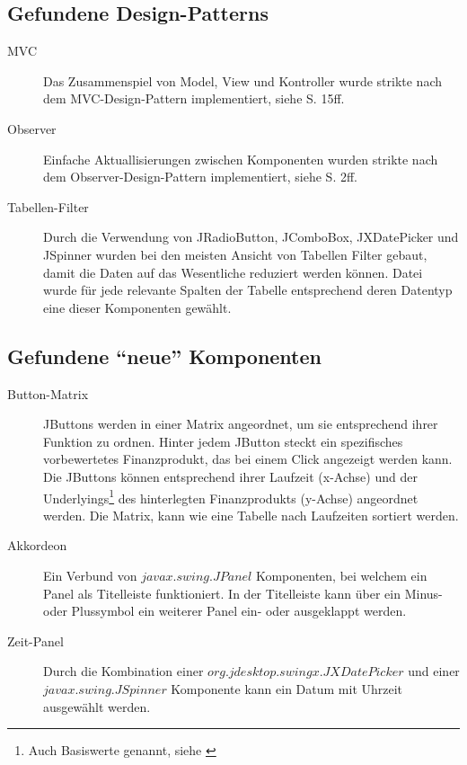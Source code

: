   \subsection{Gefundene Design-Patterns}
  
  \begin{description}
    \item[MVC]
    Das Zusammenspiel von Model, View und Kontroller wurde strikte nach dem
    MVC-Design-Pattern implementiert, siehe \cite{GUIDesignPatterns} S. 15ff.
    \item[Observer]
    Einfache Aktuallisierungen zwischen Komponenten wurden strikte nach dem
    Observer-Design-Pattern implementiert, siehe \cite{GUIDesignPatterns} S.
    2ff.
    \item[Tabellen-Filter]
    Durch die Verwendung von JRadioButton, JComboBox, JXDatePicker und JSpinner
    wurden bei den meisten Ansicht von Tabellen Filter gebaut, damit die Daten
    auf das Wesentliche reduziert werden können. Datei wurde für jede relevante
    Spalten der Tabelle entsprechend deren Datentyp eine dieser Komponenten
    gewählt.
  \end{description}
  
  \subsection{Gefundene ``neue'' Komponenten}
  
  \begin{description}
    \item[Button-Matrix]
    JButtons werden in einer Matrix angeordnet, um sie entsprechend ihrer
    Funktion zu ordnen. Hinter jedem JButton steckt ein spezifisches
    vorbewertetes Finanzprodukt, das bei einem Click angezeigt werden kann.
    Die JButtons können entsprechend ihrer Laufzeit (x-Achse) und der
    Underlyings\footnote{Auch Basiswerte genannt, siehe \cite{Basiswerte}} des
    hinterlegten Finanzprodukts (y-Achse) angeordnet werden. Die Matrix, kann
    wie eine Tabelle nach Laufzeiten sortiert werden.
    \item[Akkordeon]
    Ein Verbund von \(javax.swing.JPanel\) Komponenten, bei welchem ein
    Panel als Titelleiste funktioniert. In der Titelleiste kann über ein Minus-
    oder Plussymbol ein weiterer Panel ein- oder ausgeklappt werden.
    \item[Zeit-Panel]
    Durch die Kombination einer \(org.jdesktop.swingx.JXDatePicker\) und einer
    \(javax.swing.JSpinner\) Komponente kann ein Datum mit Uhrzeit ausgewählt
    werden.
  \end{description}
  
